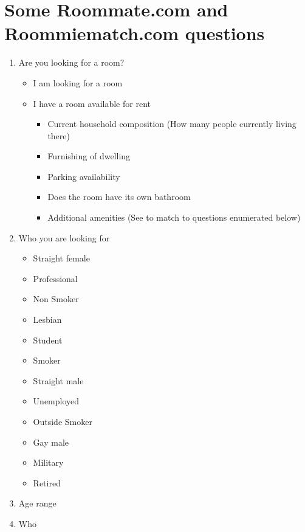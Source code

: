 \documentclass[journal]{IEEEtran}
\begin{document}
\newpage
% 



\newpage
\appendices
\section{Some Roommate.com and Roommiematch.com questions} %
\begin{enumerate}
    \item Are you looking for a room?
    \begin{itemize}
        \item I am looking for a room
        \item I have a room available for rent
        \begin{itemize}
            \item Current household composition (How many people currently living there)
            \item Furnishing of dwelling
            \item Parking availability
            \item Does the room have its own bathroom
            \item Additional amenities (See to match to questions enumerated below)
        \end{itemize}
    \end{itemize}
    \item Who you are looking for
    \begin{itemize}
        \item Straight female
        \item Professional
        \item Non Smoker
        \item Lesbian
        \item Student
        \item Smoker
        \item Straight male
        \item Unemployed
        \item Outside Smoker
        \item Gay male
        \item Military
        \item Retired
    \end{itemize}
    \item Age range
    \item Who

\end{enumerate}
\end{document}

